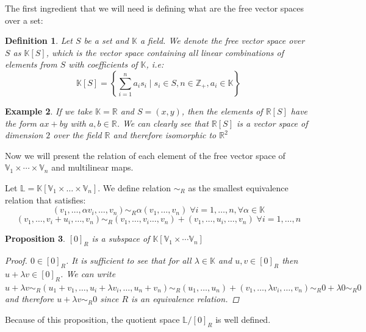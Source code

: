 \documentclass[11pt,a4paper,openright,oneside]{book}
\numberwithin{equation}{section}
\newtheorem{defn0}{Definition}[chapter]
\newtheorem{prop0}[defn0]{Proposition}
\newtheorem{example0}[defn0]{Example}
\newenvironment{definition}{ \begin{defn0}}{\end{defn0}}
\newenvironment{proposition}{\bigskip \begin{prop0}}{\end{prop0}}
\newenvironment{example}{ \begin{example0}\rm}{\end{example0}}
\begin{document}
The first ingredient that we will need is defining what are the free vector spaces over a set:

\begin{definition} Let $S$ be a set and $\mathbb{K}$ a field. We denote the free vector space over $S$ as $\mathbb{K}[S]$, which
    is the vector space containing all linear combinations of elements from $S$ with coefficients of $\mathbb{K}$, i.e:
    $$\mathbb{K}[S] = \left\{ \sum_{i=1}^n a_i s_i \mid s_i \in S, n \in \mathbb{Z}_+, a_i \in \mathbb{K}  \right\}$$
\end{definition}

\begin{example} If we take $\mathbb{K} = \mathbb{R}$ and $S = (x,y)$, then the elements of $\mathbb{R}[S]$ have the form $ax + by$ with $a, b \in \mathbb{R}$.
We can clearly see  that $\mathbb{R}[S]$ is a vector space of dimension $2$ over the field $\mathbb{R}$ and therefore
isomorphic to $\mathbb{R}^2$
\end{example}

Now we will present the relation of each element of the free vector space of $\mathbb{V}_1 \times \cdots \times \mathbb{V}_n$ and
multilinear maps.

Let $\mathbb{L} = \mathbb{K}[\mathbb{V}_1 \times \dots \times \mathbb{V}_n]$.
    We define relation $\sim_R$ as the smallest equivalence relation that satisfies: 
    $$(v_1, \dots, \alpha v_i, \dots, v_n) \sim_R \alpha(v_1, \dots, v_n) \; \forall i = 1, \dots, n, \forall \alpha \in \mathbb{K}$$
    $$(v_1, \dots, v_i + u_i, \dots, v_n) \sim_R (v_1, \dots, v_i \dots, v_n) + (v_1, \dots, u_i, \dots, v_n) \; \forall i = 1, \dots, n$$

\begin{proposition}
    $[0]_R$ is a subspace of $\mathbb{K} \left[ \mathbb{V}_1 \times \cdots \mathbb{V}_n \right]$

    \begin{proof}
        $0 \in [0]_R$. It is sufficient to see that for all $\lambda \in \mathbb{K}$ and $u, v \in [0]_R$ then $u + \lambda v \in [0]_R$.
        We can write $u + \lambda v \sim_R (u_1 + v_1, \dots, u_i + \lambda v_i, \dots, u_n + v_n) \sim_R 
        (u_1, \dots, u_n) + (v_1, \dots, \lambda v_i, \dots, v_n) \sim_R 0 + \lambda 0 \sim_R 0$ and therefore
        $u + \lambda v \sim_R 0$ since $R$ is an equivalence relation.
    \end{proof}
\end{proposition}

Because of this proposition, the quotient space $\mathbb{L} / [0]_R$ is well defined.
\end{document}
